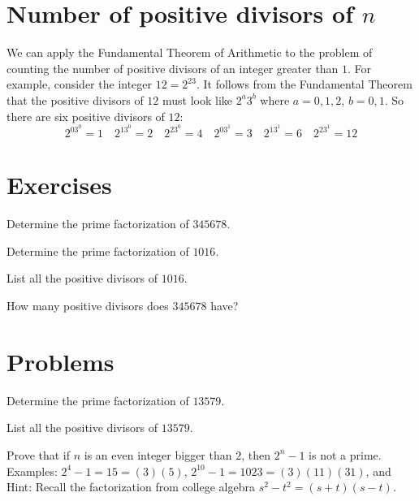 \section{Number of positive divisors of $n$}
We can apply the Fundamental Theorem of Arithmetic to the problem of
counting the number of positive divisors of an integer greater than $1$. 
For example, consider the
integer $12 = 2^23$. It follows from the Fundamental Theorem
that the positive divisors of $12$ must look like $2^a3^b$ where
$a=0,1,2$, $b=0,1$. So there are six positive divisors of $12$:
$$
2^03^0 = 1\quad 2^13^0=2\quad 2^23^0=4\quad
 2^03^1=3\quad 2^13^1=6\quad 2^23^1=12
$$ 


\clearpage

\section{Exercises}
\begin{exer} 
Determine the prime factorization of $345678$.
\end{exer}

\begin{exer} 
Determine the prime factorization of $1016$.
\end{exer}

\begin{exer} 
List all the positive divisors of $1016$.
\end{exer}

\begin{exer} 
How many positive divisors does $345678$ have?
\end{exer}

\section{Problems}

\begin{prob}
Determine the prime factorization of $13579$.
\end{prob}

\begin{prob}
List all the positive divisors of $13579$.
\end{prob}

\begin{prob}

Prove that if $n$ is an even integer bigger than $2$, then $2^{n}-1$ is not a prime.
Examples: $2^{4}- 1 = 15 = (3)(5)$, $2^{10}- 1 = 1023= (3)(11)(31)$, and  Hint: Recall the factorization from college algebra $s^{2}-t^{2}= (s+t)(s-t)$.

\end{prob}

